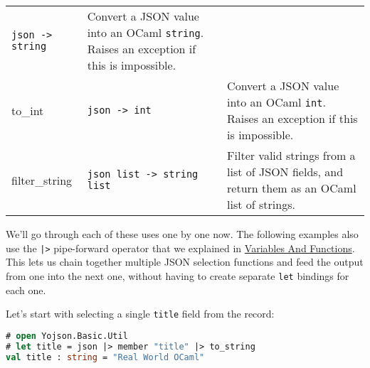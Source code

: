 \begin{longtable}[]{@{}lll@{}}
\begin{minipage}[t]{0.24\columnwidth}
\passthrough{\lstinline!json -> string!}\strut
\end{minipage} & \begin{minipage}[t]{0.32\columnwidth}\raggedright
Convert a JSON value into an OCaml \passthrough{\lstinline!string!}.
Raises an exception if this is impossible.\strut
\end{minipage}\tabularnewline
\begin{minipage}[t]{0.36\columnwidth}\raggedright
to\_int\strut
\end{minipage} & \begin{minipage}[t]{0.24\columnwidth}\raggedright
\passthrough{\lstinline!json -> int!}\strut
\end{minipage} & \begin{minipage}[t]{0.32\columnwidth}\raggedright
Convert a JSON value into an OCaml \passthrough{\lstinline!int!}. Raises
an exception if this is impossible.\strut
\end{minipage}\tabularnewline
\begin{minipage}[t]{0.36\columnwidth}\raggedright
filter\_string\strut
\end{minipage} & \begin{minipage}[t]{0.24\columnwidth}\raggedright
\passthrough{\lstinline!json list -> string list!}\strut
\end{minipage} & \begin{minipage}[t]{0.32\columnwidth}\raggedright
Filter valid strings from a list of JSON fields, and return them as an
OCaml list of strings.\strut
\end{minipage}\tabularnewline
\bottomrule
\end{longtable}

We'll go through each of these uses one by one now. The following
examples also use the \passthrough{\lstinline!|>!} pipe-forward operator
that we explained in
\href{variables-and-functions.html\#variables-and-functions}{Variables
And Functions}. This lets us chain together multiple JSON selection
functions and feed the output from one into the next one, without having
to create separate \passthrough{\lstinline!let!} bindings for each one.

Let's start with selecting a single \passthrough{\lstinline!title!}
field from the record:

\begin{lstlisting}[language=Caml]
# open Yojson.Basic.Util
# let title = json |> member "title" |> to_string
val title : string = "Real World OCaml"
\end{lstlisting}


